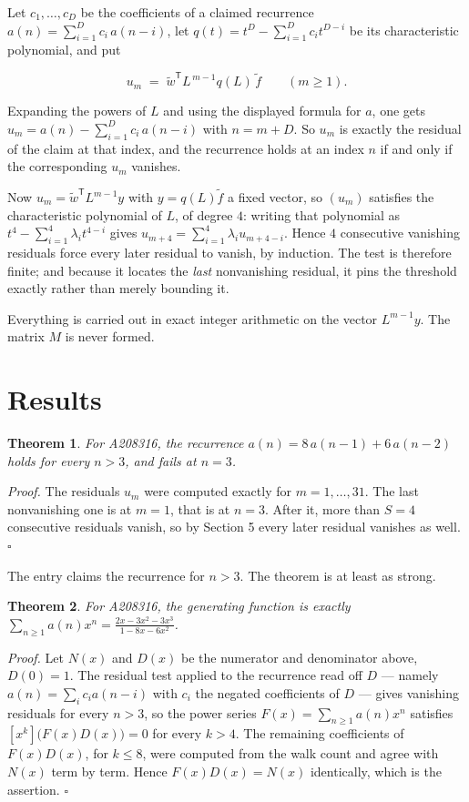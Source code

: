 \documentclass[11pt]{article}
\newtheorem{theorem}{Theorem}
\theoremstyle{definition}
\begin{document}
Let $c_1,\dots,c_D$ be the coefficients of a claimed recurrence $a(n) = \sum_{i=1}^{D} c_i\,a(n-i)$, let $q(t) = t^{D} - \sum_{i=1}^{D} c_i t^{D-i}$ be its characteristic polynomial, and put

\[u_m \;=\; \tilde w^{\mathsf T} L^{\,m-1} q(L)\,\tilde f \qquad (m \ge 1).\]

Expanding the powers of $L$ and using the displayed formula for $a$, one gets $u_m = a(n) - \sum_{i=1}^{D} c_i\,a(n-i)$ with $n = m + D$. So $u_m$ is exactly the residual of the claim at that index, and the recurrence holds at an index $n$ if and only if the corresponding $u_m$ vanishes.

Now $u_m = \tilde w^{\mathsf T} L^{m-1} y$ with $y = q(L)\tilde f$ a fixed vector, so $(u_m)$ satisfies the characteristic polynomial of $L$, of degree $4$: writing that polynomial as $t^{4} - \sum_{i=1}^{4} \lambda_i t^{4-i}$ gives $u_{m+4} = \sum_{i=1}^{4} \lambda_i u_{m+4-i}$. Hence $4$ consecutive vanishing residuals force every later residual to vanish, by induction. The test is therefore finite; and because it locates the {\itshape last} nonvanishing residual, it pins the threshold exactly rather than merely bounding it.

Everything is carried out in exact integer arithmetic on the vector $L^{m-1}y$. The matrix $M$ is never formed.

\section{Results}

\begin{theorem} For A208316, the recurrence $a(n) = 8\,a(n-1) + 6\,a(n-2)$ holds for every $n > 3$, and fails at $n = 3$.\end{theorem}

{\itshape Proof.} The residuals $u_m$ were computed exactly for $m = 1,\dots,31$. The last nonvanishing one is at $m = 1$, that is at $n = 3$. After it, more than $S = 4$ consecutive residuals vanish, so by Section 5 every later residual vanishes as well. $\square$

The entry claims the recurrence for $n > 3$. The theorem is at least as strong.

\begin{theorem} For A208316, the generating function is exactly $\sum_{n\ge 1} a(n)x^n = \frac{2x - 3x^{2} - 3x^{3}}{1 - 8x - 6x^{2}}$.\end{theorem}

{\itshape Proof.} Let $N(x)$ and $D(x)$ be the numerator and denominator above, $D(0)=1$. The residual test applied to the recurrence read off $D$ --- namely $a(n) = \sum_i c_i a(n-i)$ with $c_i$ the negated coefficients of $D$ --- gives vanishing residuals for every $n > 3$, so the power series $F(x)=\sum_{n\ge 1}a(n)x^n$ satisfies $[x^k]\bigl(F(x)D(x)\bigr) = 0$ for every $k > 4$. The remaining coefficients of $F(x)D(x)$, for $k \le 8$, were computed from the walk count and agree with $N(x)$ term by term. Hence $F(x)D(x) = N(x)$ identically, which is the assertion. $\square$
\end{document}
